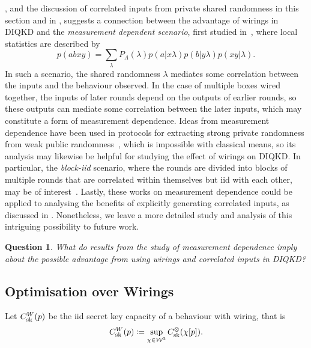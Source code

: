 \documentclass[10pt, a4paper]{article}
\numberwithin{equation}{section} %
\theoremstyle{definition}
\theoremstyle{plain}
\newtheorem{question}{Question}
\newcommand{\?}{\mathrel{?}} %
\newcommand{\sW}{\mathcal{W}}
\newcommand{\sk}{\rm sk}
\begin{document}
    , and the discussion of correlated inputs from private shared randomness in this section and in , suggests a connection between the advantage of wirings in DIQKD and the \emph{measurement dependent scenario}, first studied in~\cite{RelaxedBell}, where local statistics are described by~\cite[Eq. 2]{MDLBeyondIID}
              \begin{equation}
                p(abxy) = \sum_{\lambda} P_{\Lambda}(\lambda) p(a|x\lambda) p(b|y\lambda) p(xy|\lambda).
              \end{equation}
              In such a scenario, the shared randomness \(\lambda\) mediates some correlation between the inputs and the behaviour observed. In the case of multiple boxes wired together, the inputs of later rounds depend on the outputs of earlier rounds, so these outputs can mediate some correlation between the later inputs, which may constitute a form of measurement dependence. Ideas from measurement dependence have been used in protocols for extracting strong private randomness from weak public randomness~\cite{DIRA}, which is impossible with classical means, so its analysis may likewise be helpful for studying the effect of wirings on DIQKD\@. In particular, the  \emph{block-iid} scenario, where the rounds are divided into blocks of multiple rounds that are correlated within themselves but iid with each other, may be of interest~\cite{MDLBeyondIID}. Lastly, these works on measurement dependence could be applied to analysing the benefits of explicitly generating correlated inputs, as discussed in . Nonetheless, we leave a more detailed study and analysis of this intriguing possibility to future work.
              \begin{question}
                What do results from the study of measurement dependence imply about the possible advantage from using wirings and correlated inputs in DIQKD\@?
              \end{question}

              \subsection{Optimisation over Wirings}\label{sec:krwir_wiropt}


                  Let \(C^{W}_{\sk}(p)\) be the iid secret key capacity of a behaviour with wiring, that is
                  \begin{equation}
                    C^{W}_{\sk}(p) \coloneqq \sup_{\chi\in\sW^2} C^{\otimes}_{\sk}(\chi[p]).
                  \end{equation}
\end{document}
